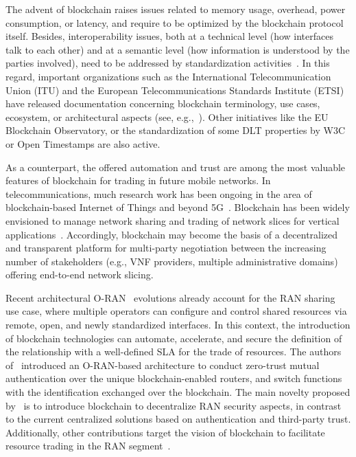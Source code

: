 \documentclass[journal]{IEEEtran}
\begin{document}
	The advent of blockchain raises issues related to memory usage, overhead, power consumption, or latency, and require to be optimized by the blockchain protocol itself. Besides, interoperability issues, both at a technical level (how interfaces talk to each other) and at a semantic level (how information is understood by the parties involved), need to be addressed by standardization activities~\cite{konig2020comparing}. In this regard, important organizations such as the International Telecommunication Union (ITU) and the European Telecommunications Standards Institute (ETSI) have released documentation concerning blockchain terminology, use cases, ecosystem, or architectural aspects (see, e.g.,~\cite{ITU1400,etsi2020permissioned}). Other initiatives like the EU Blockchain Observatory, or the standardization of some DLT properties by W3C or Open Timestamps are also active. %
	
	As a counterpart, the offered automation and trust are among the most valuable features of blockchain for trading in future mobile networks. In telecommunications, much research work has been ongoing in the area of blockchain-based Internet of Things and beyond 5G~\cite{nguyen2020blockchain}. Blockchain has been widely envisioned to manage network sharing and trading of network slices for vertical applications~\cite{xu2020blockchain}. Accordingly, blockchain may become the basis of a decentralized and transparent platform for multi-party negotiation between the increasing number of stakeholders (e.g., VNF providers, multiple administrative domains) offering end-to-end network slicing. 
	
	Recent architectural O-RAN~\cite{ORANall} evolutions already account for the RAN sharing use case, where multiple operators can configure and control shared resources via remote, open, and newly standardized interfaces. In this context, the introduction of blockchain technologies can automate, accelerate, and secure the definition of the relationship with a well-defined SLA for the trade of resources. The authors of~\cite{xu2021ran} introduced an O-RAN-based architecture to conduct zero-trust mutual authentication over the unique blockchain-enabled routers, and switch functions with the identification exchanged over the blockchain. The main novelty proposed by~\cite{xu2021ran} is to introduce blockchain to decentralize RAN security aspects, in contrast to the current centralized solutions based on authentication and third-party trust. Additionally, other contributions target the vision of blockchain to facilitate resource trading in the RAN segment~\cite{maksymyuk2020blockchain, togou2020dbns}. %
	
\end{document}
